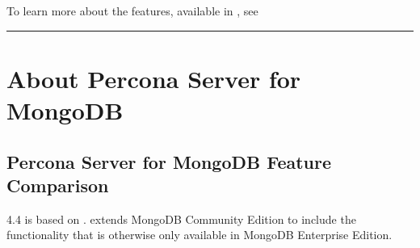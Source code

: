 \documentclass[letterpaper,10pt,english]{sphinxmanual}
\begin{document}
\sphinxAtStartPar
To learn more about the features, available in , see {\hyperref[\detokenize{comparison:compare}]{}}


\bigskip\hrule\bigskip



\part{About Percona Server for MongoDB}
\label{\detokenize{index:about-percona-server-for-mongodb}}

\chapter{Percona Server for MongoDB Feature Comparison}
\label{\detokenize{comparison:percona-server-for-mongodb-feature-comparison}}\label{\detokenize{comparison:compare}}\label{\detokenize{comparison::doc}}
\sphinxAtStartPar
{} 4.4 is based on .  extends MongoDB
Community Edition to include the functionality that is otherwise only available
in MongoDB Enterprise Edition.
\end{document}
